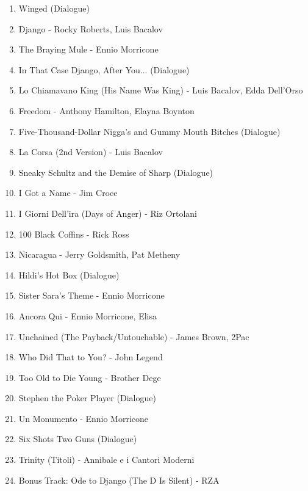 \documentclass[12pt]{article} %
\begin{document}
                        \begin{enumerate}
                            \item Winged (Dialogue)
                            \item Django - Rocky Roberts, Luis Bacalov
                            \item The Braying Mule - Ennio Morricone
                            \item In That Case Django, After You... (Dialogue)
                            \item Lo Chiamavano King (His Name Was King) - Luis Bacalov, Edda Dell'Orso
                            \item Freedom - Anthony Hamilton, Elayna Boynton
                            \item Five-Thousand-Dollar Nigga's and Gummy Mouth Bitches (Dialogue)
                            \item La Corsa (2nd Version) - Luis Bacalov
                            \item Sneaky Schultz and the Demise of Sharp (Dialogue)
                            \item I Got a Name - Jim Croce
                            \item I Giorni Dell'ira (Days of Anger) - Riz Ortolani
                            \item 100 Black Coffins - Rick Ross
                            \item Nicaragua - Jerry Goldsmith, Pat Metheny
                            \item Hildi's Hot Box (Dialogue)
                            \item Sister Sara's Theme - Ennio Morricone
                            \item Ancora Qui - Ennio Morricone, Elisa
                            \item Unchained (The Payback/Untouchable) - James Brown, 2Pac
                            \item Who Did That to You? - John Legend
                            \item Too Old to Die Young - Brother Dege
                            \item Stephen the Poker Player (Dialogue)
                            \item Un Monumento - Ennio Morricone
                            \item Six Shots Two Guns (Dialogue)
                            \item Trinity (Titoli) - Annibale e i Cantori Moderni
                            \item Bonus Track: Ode to Django (The D Is Silent) - RZA
                        \end{enumerate}
                    
\end{document}
